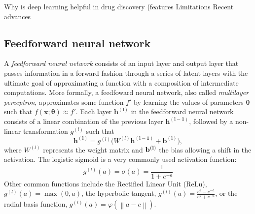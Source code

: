 \documentclass[bsc,frontabs,twoside,singlespacing,parskip,deptreport]{infthesis}     %
\let\Oldsubsection\subsection
\renewcommand{\subsection}{\FloatBarrier\Oldsubsection}
\begin{document}
Why is deep learning helpful in drug discovery (features
Limitations
Recent advances
\subsection{Feedforward neural network}
A \textit{feedforward neural network} consists of an input layer and output layer that passes information in a forward fashion through a series of latent layers with the ultimate goal of approximating a function with a composition of intermediate computations. More formally, a feedfoward neural network, also called \textit{multilayer perceptron}, approximates some function \(f'\) by learning the values of parameters \(\mathbf{\theta}\) such that \(f(\mathbf{x} ; \mathbf{\theta}) \approx f'\).
Each layer \(\bm{h^{(l)}}\)  in the feedforward neural network consists of a linear combination of the previous layer \(\bm{h^{(l-1)}}\), followed by a non-linear transformation \(g^{(l)}\) such that \[\bm{h^{(l)}} = g^{(l)}(W^{(l)}\bm{h^{(l-1)}} + \bm{b^{(l)})},\]
where \(W^{(l)}\) represents the weight matrix and \(\bf{b^{(l)}}\) the bias allowing a shift in the activation. The logistic sigmoid is a very commonly used activation function: \[g^{(l)}(a) = \sigma(a) = \frac{1}{1+e^{-a}}\]
Other common functions include the Rectified Linear Unit (ReLu), \(g^{(l)}(a)= \max(0, a)\), the hyperbolic tangent, \(g^{(l)}(a)={\frac {e^{a}-e^{-a}}{e^{a}+e^{-a}}}\), or the radial basis function, \(g^{(l)}(a)=\varphi (\left\|a -c \right\|)\).
\end{document}
